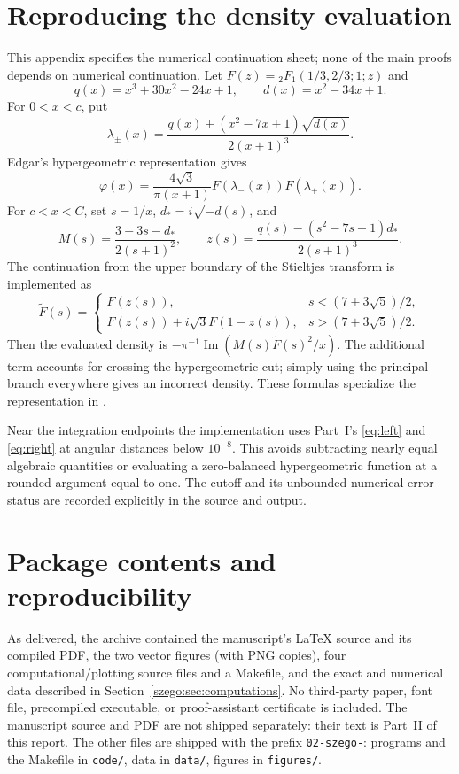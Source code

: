 \documentclass[11pt,a4paper]{article}
\numberwithin{equation}{section}
\theoremstyle{remark}\newtheorem{remark}[theorem]{Remark}
\begin{document}
\section{Reproducing the density evaluation}
\label{szego:app:density}
This appendix specifies the numerical continuation sheet; none of the
main proofs depends on numerical continuation.
Let $F(z)={}_2F_1(1/3,2/3;1;z)$ and
\[
 q(x)=x^3+30x^2-24x+1,\qquad d(x)=x^2-34x+1.
\]
For $0<x<c$, put
\[
 \lambda_\pm(x)=\frac{q(x)\pm(x^2-7x+1)\sqrt{d(x)}}{2(x+1)^3}.
\]
Edgar's hypergeometric representation gives
\begin{equation}\label{szego:eq:numericdensityleft}
 \varphi(x)=\frac{4\sqrt3}{\pi(x+1)}F(\lambda_-(x))F(\lambda_+(x)).
\end{equation}
For $c<x<C$, set $s=1/x$, $d_*=i\sqrt{-d(s)}$, and
\[
 M(s)=\frac{3-3s-d_*}{2(s+1)^2},\qquad
 z(s)=\frac{q(s)-(s^2-7s+1)d_*}{2(s+1)^3}.
\]
The continuation from the upper boundary of the Stieltjes transform is
implemented as
\[
 \widetilde F(s)=
 \begin{cases}
 F(z(s)),&s<(7+3\sqrt5)/2,\\
 F(z(s))+i\sqrt3 F(1-z(s)),&s>(7+3\sqrt5)/2.
 \end{cases}
\]
Then the evaluated density is
$-\pi^{-1}\operatorname{Im}(M(s)\widetilde F(s)^2/x)$.
The additional term accounts for crossing the hypergeometric cut; simply
using the principal branch everywhere gives an incorrect density.
These formulas specialize the representation in \cite[Proposition 23]{edgar}.

Near the integration endpoints the implementation uses
Part~I's \eqref{eq:left} and \eqref{eq:right} at angular distances below $10^{-8}$.
This avoids subtracting nearly equal algebraic quantities or evaluating a
zero-balanced hypergeometric function at a rounded argument equal to one.
The cutoff and its unbounded numerical-error status are recorded explicitly
in the source and output.

\section{Package contents and reproducibility}
\label{szego:app:package}
As delivered, the archive contained the manuscript's \LaTeX{} source and its
compiled PDF, the two vector figures (with PNG copies), four
computational/plotting source files and a Makefile, and the exact and
numerical data described in Section~\ref{szego:sec:computations}.
No third-party paper, font file, precompiled executable, or proof-assistant
certificate is included. The manuscript source and PDF are not shipped
separately: their text is Part~II of this report. The other files are
shipped with the prefix \texttt{02-szego-}: programs and the Makefile in
\texttt{code/}, data in \texttt{data/}, figures in \texttt{figures/}.
\end{document}
